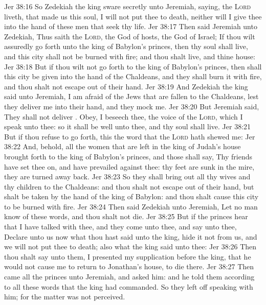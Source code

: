 \vs Jer 38:16 So Zedekiah the king sware secretly unto Jeremiah, saying,  the \textsc{Lord} liveth, that made us this soul, I will not put thee to death, neither will I give thee into the hand of these men that seek thy life.
\vs Jer 38:17 Then said Jeremiah unto Zedekiah, Thus saith the \textsc{Lord}, the God of hosts, the God of Israel; If thou wilt assuredly go forth unto the king of Babylon's princes, then thy soul shall live, and this city shall not be burned with fire; and thou shalt live, and thine house:
\vs Jer 38:18 But if thou wilt not go forth to the king of Babylon's princes, then shall this city be given into the hand of the Chaldeans, and they shall burn it with fire, and thou shalt not escape out of their hand.
\vs Jer 38:19 And Zedekiah the king said unto Jeremiah, I am afraid of the Jews that are fallen to the Chaldeans, lest they deliver me into their hand, and they mock me.
\vs Jer 38:20 But Jeremiah said, They shall not deliver . Obey, I beseech thee, the voice of the \textsc{Lord}, which I speak unto thee: so it shall be well unto thee, and thy soul shall live.
\vs Jer 38:21 But if thou refuse to go forth, this  the word that the \textsc{Lord} hath shewed me:
\vs Jer 38:22 And, behold, all the women that are left in the king of Judah's house  brought forth to the king of Babylon's princes, and those  shall say, Thy friends have set thee on, and have prevailed against thee: thy feet are sunk in the mire,  they are turned away back.
\vs Jer 38:23 So they shall bring out all thy wives and thy children to the Chaldeans: and thou shalt not escape out of their hand, but shalt be taken by the hand of the king of Babylon: and thou shalt cause this city to be burned with fire.
\vs Jer 38:24 Then said Zedekiah unto Jeremiah, Let no man know of these words, and thou shalt not die.
\vs Jer 38:25 But if the princes hear that I have talked with thee, and they come unto thee, and say unto thee, Declare unto us now what thou hast said unto the king, hide it not from us, and we will not put thee to death; also what the king said unto thee:
\vs Jer 38:26 Then thou shalt say unto them, I presented my supplication before the king, that he would not cause me to return to Jonathan's house, to die there.
\vs Jer 38:27 Then came all the princes unto Jeremiah, and asked him: and he told them according to all these words that the king had commanded. So they left off speaking with him; for the matter was not perceived.
